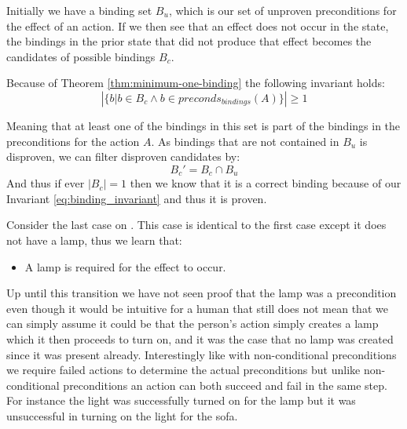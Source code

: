 \documentclass[../Master.tex]{subfiles}
\begin{document}
Initially we have a binding set $B_u$, which is our set of unproven preconditions for the effect of an action.
If we then see that an effect does not occur in the state, the bindings in the prior state that did not produce that effect becomes the candidates of possible bindings $B_c$.

Because of Theorem \ref{thm:minimum-one-binding} the following invariant holds:
\begin{equation} \label{eq:binding_invariant}
\left| \{b  |  b \in B_c \land b \in preconds_{bindings}(A)\} \right|  \ge 1
\end{equation}


Meaning that at least one of the bindings in this set is part of the bindings in the preconditions for the action $A$. As bindings that are not contained in $B_u$ is disproven, we can filter disproven candidates by:
\begin{equation}
B_c' = B_c \cap B_u
\end{equation}
And thus if ever $|B_c| = 1$ then we know that it is a correct binding because of our Invariant \ref{eq:binding_invariant} and thus it is proven.

 \begin{example}\label{ex:ca:light-on-3}
 Consider the last case on . This case is identical
to the first case except it does not have a lamp, thus we learn that:
\begin{itemize}
	\item A lamp is required for the effect to occur.
\end{itemize}
Up until this transition we have not seen proof that the lamp was a precondition even though it would be intuitive for a human that still
does not mean that we can simply assume it could be that the person's action simply creates a
lamp which it then proceeds to turn on, and it was the case that no
lamp was created since it was present already.
Interestingly like with non-conditional preconditions we require failed actions to determine the actual preconditions but unlike non-conditional preconditions an action can both succeed and fail in the same step. For instance the light was successfully turned on for the lamp but it was unsuccessful in turning on the light for the sofa.

\end{example}
\end{document}
